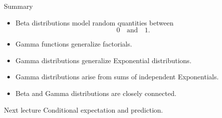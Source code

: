 \begin{frame}{Summary}
\begin{itemize}
    \item Beta distributions model random quantities between
    \[
    0
    \quad \text{and} \quad
    1.
    \]

    \item Gamma functions generalize factorials.

    \item Gamma distributions generalize Exponential distributions.

    \item Gamma distributions arise from sums of independent Exponentials.

    \item Beta and Gamma distributions are closely connected.
\end{itemize}

\vspace{0.25cm}

\begin{keybox}{Next lecture}
Conditional expectation and prediction.
\end{keybox}
\end{frame}